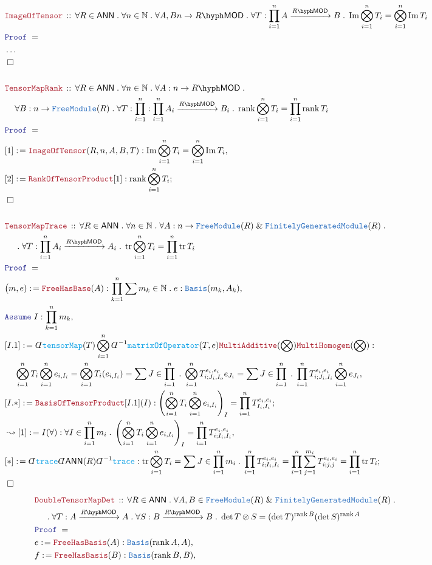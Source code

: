 \documentclass[12pt]{scrartcl}%
\newcommand{\TYPE}[1]{\textcolor{NavyBlue}{\mathtt{#1}}}%
\newcommand{\FUNC}[1]{\textcolor{Cerulean}{\mathtt{#1}}}%
\newcommand{\LOGIC}[1]{\textcolor{Blue}{\mathtt{#1}}}%
\newcommand{\THM}[1]{\textcolor{Maroon}{\mathtt{#1}}}%
\renewcommand{\.}{\; . \;} %
\newcommand{\de}{: \kern 0.1pc =} %
\newcommand{\Theorem}[2]{& \THM{#1} \, :: \, #2 \\ & \Proof = \\ } %
\newcommand{\NewLine}{\\ & \kern 1pc}%
\newcommand{\Page}[1]{ \begin{align*} #1 \end{align*}  }%
\newcommand{ \bd }{ \ByDef }%
\newcommand{\NoProof}{ & \ldots \\ \EndProof}%
\renewcommand{\And}{\; \& \;}%
\newcommand{\Nat}{\mathbb{N}}%
\DeclareMathOperator*{\im}{Im}%
\newcommand{\Say}[3]{& #1 \de #2 : #3, \\} %
\newcommand{\Conclude}[3]{& #1 \de #2 : #3; \\}%
\newcommand{\Derive}[3]{& \leadsto #1 \de #2 : #3, \\} %
\newcommand{\Assume}[2]{& \LOGIC{Assume} \; #1 : #2, \\} %
\newcommand{\QED}{\; \square} %
\newcommand{\EndProof}{& \QED \\} %
\newcommand{\ByDef}{\rotatebox[origin=c]{-180}{$D$}}%
\newcommand{\Proof}{\LOGIC{Proof} \; } %
\newcommand{\Arrow}[1]{\xrightarrow{#1}}%
\DeclareMathOperator{\rank}{rank} %
\newcommand{\Basis}{\TYPE{Basis}} %
\newcommand{\FGM}{\TYPE{FinitelyGeneratedModule}}%
\newcommand{\FM}{\TYPE{FreeModule}}
\DeclareMathOperator{\tr}{tr}     %
\newcommand{\LMOD}[1]{#1\hyph\mathsf{MOD}} %
\newcommand{\ANN}{\mathsf{ANN}} %
\begin{document}
\Page{
	\Theorem{ImageOfTensor}{\forall R \in \ANN \. \forall n \in \Nat \. \forall  A,B  n \to  \LMOD{R} \. \forall T : \prod^n_{i=1} A \Arrow{\LMOD{R}} B \. 
		\im \bigotimes^n_{i=1} T_i = \bigotimes^n_{i=1} \im T_i}
	\NoProof
	\\
	\Theorem{TensorMapRank}{
			\forall R \in \ANN \. 
			\forall n \in \Nat \.
			\forall A : n \to \LMOD{R} \. \NewLine
			\forall B : n \to \FM(R) \.
			\forall T : \prod^n_{i=1} : \prod^n_{i=1} A_i \Arrow{\LMOD{R}} B_i \.
			\rank \bigotimes^n_{i=1} T_i = \prod^n_{i=1} \rank T_i
		}
	\Say{[1]}{\THM{ImageOfTensor}(R,n,A,B,T)}{\im \bigotimes^n_{i=1} T_i = \bigotimes^n_{i=1} \im T_i}
	\Conclude{[2]}{ \THM{RankOfTensorProduct}[1]}{\rank \bigotimes^n_{i=1} T_i} 
	\EndProof
	\\
	\Theorem{TensorMapTrace}{
		\forall R \in \ANN \.
		\forall n \in \Nat \.
		\forall A : n \to \FM(R) \And \FGM(R) \. \NewLine \. 
		\forall T :  \prod^n_{i=1} A_i \Arrow{\LMOD{R}} A_i \.
		\tr \bigotimes^n_{i=1} T_i = \prod^n_{i=1} \tr T_i
	}
	\Say{\big(m,e)}{\THM{FreeHasBase}(A)}{ \prod^n_{k=1} \sum m_k \in \Nat \. e : \TYPE{Basis}(m_k,A_k) } 
	\Assume{I}{\prod^n_{k=1}m_k}
	\Say{[I.1]}{
		\bd \FUNC{tensorMap}(T)\bigotimes^n_{i=1}
		\bd^{-1} \FUNC{matrixOfOperator}(T,e) 
		\THM{MultiAdditive}(\bigotimes) 
		\THM{MultiHomogen}(\bigotimes)
	}
	{
		\NewLine
		\bigotimes^n_{i=1} T_i \bigotimes^n_{i=1} e_{i,I_i} = 
		\bigotimes^n_{i=1} T_i(e_{i,I_i}) = 
		\sum J \in \prod^n_{i=1} \.  \bigotimes^n_{i=1}T^{e_i,e_i}_{i;J_{i},I_{o}}e_{J_{i}} =
		\sum J \in \prod^n_{i=1} \. \prod^n_{i=1} T^{e_i,e_i}_{i;J_{i},I_{i}}\bigotimes^n_{i=1} e_{J_{i}} 
	}
	\Conclude{[I.*]}{ \THM{BasisOfTensorProduct}[I.1](I)}{   
		 \left( \bigotimes^n_{i=1} T_i \bigotimes^n_{i=1} e_{i,I_i} \right)_I = 
		 \prod^n_{i=1} T^{e_i,e_i}_{I_i,I_i}
	}
	\Derive{[1]}{I(\forall)}{
		\forall I \in \prod^n_{i=1} m_i \.   
		 \left( \bigotimes^n_{i=1} T_i \bigotimes^n_{i=1} e_{i,I_i} \right)_I = 
		 \prod^n_{i=1} T^{e_i,e_i}_{i;I_i,I_i} }
	 \Conclude{[*]}{\bd\FUNC{trace}\bd\ANN(R)\bd^{-1}\FUNC{trace}}{ 
	 	\tr \bigotimes^n_{i=1} T_i = 
		\sum J \in \prod^n_{i=1} m_i \.  \prod^n_{i=1}  T^{e_i,e_i}_{i;I_i,I_i} =   
		\prod^n_{i=1} \sum^{m_i}_{j=1} T^{e_i,e_i}_{i;j,j} =
		\prod^n_{i=1} \tr T_i
	}
	\EndProof
}\Page{
	\Theorem{DoubleTensorMapDet}{
		\forall R \in \ANN \.
		\forall A, B \in \FM(R) \And \FGM(R) \. \NewLine \.
		\forall T : A \Arrow{\LMOD{R}} A \.
		\forall S : B \Arrow{\LMOD{R}} B \.
		\det T \otimes S = (\det T)^{\rank B}(\det S)^{\rank A}
	}
	\Say{e}{\THM{FreeHasBasis}(A)}{\Basis(\rank A,A)}
	\Say{f}{\THM{FreeHasBasis}(B)}{\Basis(\rank B,B)}
}
\end{document}
